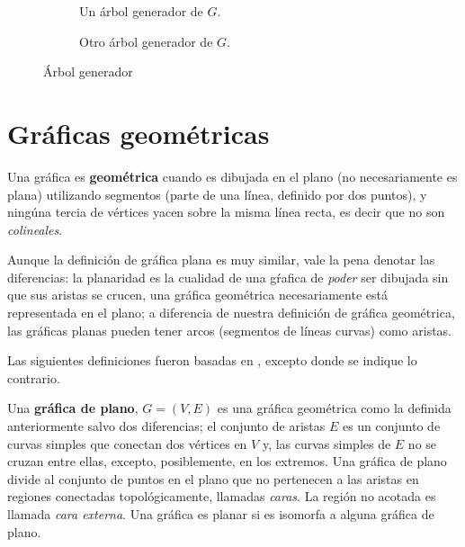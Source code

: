 \begin{figure}
\centering
  \begin{subfigure}{0.4\textwidth}
  \caption{Un \'arbol generador de $G$.}\label{fig:graph}
  \end{subfigure}
  \begin{subfigure}{0.4\textwidth}
  \caption{Otro \'arbol generador de $G$.}
  \end{subfigure}
  \caption{\'Arbol generador}
\end{figure}

\section{Gr\'aficas geom\'etricas}

\begin{definition}
Una gr\'afica es \textbf{geom\'etrica} cuando es dibujada en el plano (no necesariamente es plana) utilizando segmentos (parte de una l\'inea, definido por dos puntos), y ning\'una tercia de v\'ertices yacen sobre la misma l\'inea recta, es decir que no son \emph{colineales}. \cite{handbook}
\end{definition}

Aunque la definición de gráfica plana es muy similar, vale la pena denotar las diferencias: la planaridad es la cualidad de una gŕafica de \textit{poder} ser dibujada sin que sus aristas se crucen, una gráfica geométrica necesariamente está representada en el plano; a diferencia de nuestra definición de gráfica geométrica, las gráficas planas pueden tener arcos (segmentos de líneas curvas) como aristas.

Las siguientes definiciones fueron basadas en \cite{tamassia}, excepto donde se indique lo contrario.

\begin{definition}
Una \textbf{gr\'afica de plano}, $G=(V, E)$ es una gr\'afica geom\'etrica como la definida anteriormente salvo dos diferencias; el conjunto de aristas $E$ es un conjunto de curvas simples que conectan dos v\'ertices en $V$ y, las curvas simples de $E$ no se cruzan entre ellas, excepto, posiblemente, en los extremos. Una gr\'afica de plano divide al conjunto de puntos en el plano que no pertenecen a las aristas en regiones conectadas topológicamente, llamadas \emph{caras}. La región no acotada es llamada \emph{cara externa}. Una gr\'afica es planar si es isomorfa a alguna gr\'afica de plano.
\end{definition}

